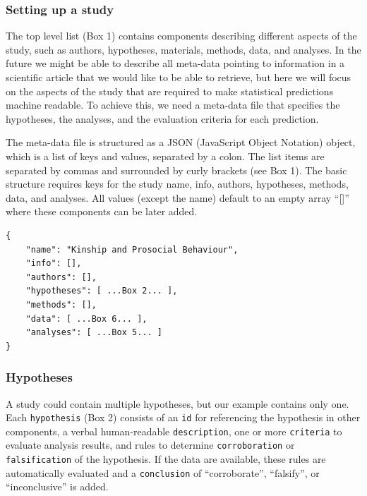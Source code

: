 \documentclass[
  english,
  doc,floatsintext]{apa6}
\begin{document}
\hypertarget{setting-up-a-study}{%
\subsubsection{Setting up a study}\label{setting-up-a-study}}

The top level list (Box 1) contains components describing different aspects of the study, such as authors, hypotheses, materials, methods, data, and analyses. In the future we might be able to describe all meta-data pointing to information in a scientific article that we would like to be able to retrieve, but here we will focus on the aspects of the study that are required to make statistical predictions machine readable. To achieve this, we need a meta-data file that specifies the hypotheses, the analyses, and the evaluation criteria for each prediction.

The meta-data file is structured as a JSON (JavaScript Object Notation) object, which is a list of keys and values, separated by a colon. The list items are separated by commas and surrounded by curly brackets (see Box 1). The basic structure requires keys for the study name, info, authors, hypotheses, methods, data, and analyses. All values (except the name) default to an empty array \enquote{{[}{]}} where these components can be later added.

\begin{tcolorbox}[colback=black!5!white,colframe=white!5!black,title=Box 1. The top-level structure of the machine-readable study description.]
\begin{verbatim}
{
    "name": "Kinship and Prosocial Behaviour",
    "info": [],
    "authors": [],
    "hypotheses": [ ...Box 2... ],
    "methods": [],
    "data": [ ...Box 6... ],
    "analyses": [ ...Box 5... ]
}
\end{verbatim}
\end{tcolorbox}

\hypertarget{hypotheses}{%
\subsubsection{Hypotheses}\label{hypotheses}}

A study could contain multiple hypotheses, but our example contains only one. Each \texttt{hypothesis} (Box 2) consists of an \texttt{id} for referencing the hypothesis in other components, a verbal human-readable \texttt{description}, one or more \texttt{criteria} to evaluate analysis results, and rules to determine \texttt{corroboration} or \texttt{falsification} of the hypothesis. If the data are available, these rules are automatically evaluated and a \texttt{conclusion} of \enquote{corroborate}, \enquote{falsify}, or \enquote{inconclusive} is added.
\end{document}
